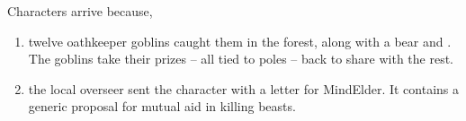 \begin{multicols}{2}
{  Characters arrive because,

  \begin{enumerate}
    \item
    twelve oathkeeper goblins caught them in the forest, along with a bear and .
    The goblins take their prizes -- all tied to poles -- back to share with the rest.
    \item
    the local overseer sent the character with a letter for \gls{MindElder}.
    It contains a generic proposal for mutual aid in killing beasts.
  \end{enumerate}

}

\end{multicols}

\printglossary[
  title={Factions},
  type=people,
  style=topicmcols,
  ]

